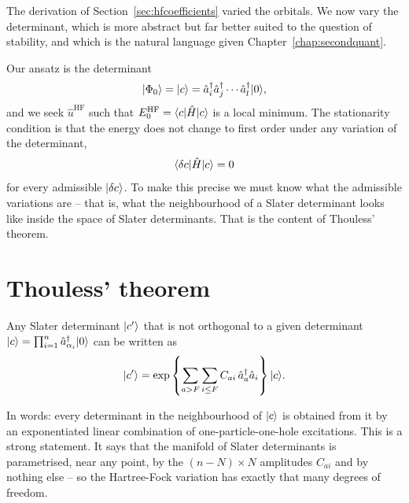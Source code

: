 The derivation of Section~\ref{sec:hfcoefficients} varied the orbitals.  We
now vary the determinant, which is more abstract but far better suited to the
question of stability, and which is the natural language given
Chapter~\ref{chap:secondquant}.

Our ansatz is the determinant
\begin{equation}
  \vert \Phi_0 \rangle = \vert c \rangle
  = \hat{a}^{\dagger}_{i}\hat{a}^{\dagger}_{j}\cdots
    \hat{a}^{\dagger}_{l}\vert 0 \rangle,
  \label{eq:6-cstate}
\end{equation}
and we seek $\hat{u}^{\mathrm{HF}}$ such that
$E_0^{\mathrm{HF}}=\langle c | \hat{H} | c \rangle$ is a local minimum.  The
stationarity condition is that the energy does not change to first order under
any variation of the determinant,
\begin{equation}
  \langle \delta c | \hat{H} | c \rangle = 0
  \label{eq:6-stationarity}
\end{equation}
for every admissible $\vert \delta c \rangle$.  To make this precise we must know
what the admissible variations are -- that is, what the neighbourhood of a
Slater determinant looks like inside the space of Slater determinants.  That
is the content of Thouless' theorem.

\section{Thouless' theorem}
\label{sec:thouless}

\begin{theorem}[Thouless]
Any Slater determinant $\vert c' \rangle$ that is not orthogonal to a given
determinant $\vert c \rangle=\prod_{i=1}^{n}\hat{a}^{\dagger}_{\alpha_i}\vert 0 \rangle$ can
be written as
\begin{equation}
  \vert c' \rangle = \exp\left\{\sum_{a>F}\sum_{i\le F}
    C_{ai}\,\hat{a}^{\dagger}_{a}\hat{a}_{i}\right\}\vert c \rangle .
  \label{eq:6-thouless}
\end{equation}
\end{theorem}

In words: every determinant in the neighbourhood of $\vert c \rangle$ is obtained
from it by an exponentiated linear combination of one-particle-one-hole
excitations.  This is a strong statement.  It says that the manifold of Slater
determinants is parametrised, near any point, by the $(n-N)\times N$
amplitudes $C_{ai}$ and by nothing else -- so the Hartree-Fock variation has
exactly that many degrees of freedom.

